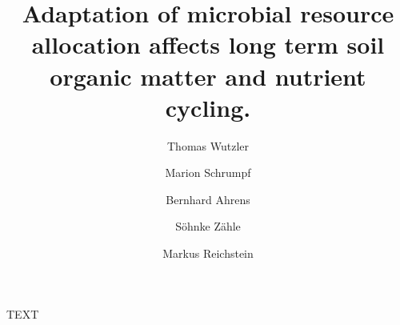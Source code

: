 \documentclass[soil]{copernicus}
\begin{document}
 

\linenumbers

\title{Adaptation of microbial resource allocation affects long term soil organic matter and nutrient cycling.}

\author[1]{Thomas Wutzler}
\author[1]{Marion Schrumpf}
\author[1]{Bernhard Ahrens}
\author[1]{S\"ohnke Z\"ahle}
\author[1]{Markus Reichstein}










\received{}
\pubdiscuss{} %
\revised{}
\accepted{}
\published{} 




\maketitle  %





\begin{abstract}

\end{abstract}






\appendix






\begin{acknowledgements}
TEXT
\end{acknowledgements} 
\end{document}
